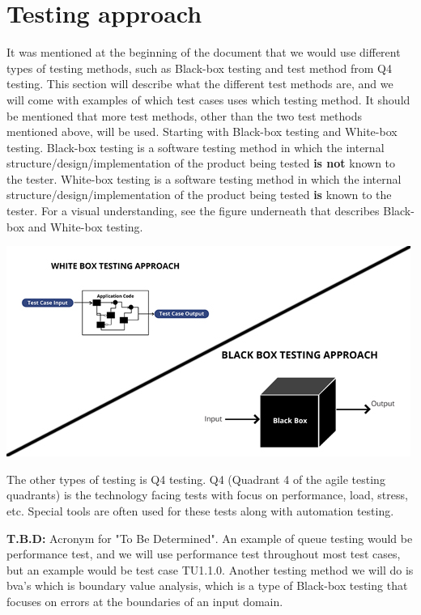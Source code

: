 \documentclass{article}
\begin{document}
\section*{Testing approach}
It was mentioned at the beginning of the document that we would use different types of testing methods, such as Black-box testing and test method from Q4 testing. This section will describe what the different test methods are, and we will come with examples of which test cases uses which testing method. It should be mentioned that more test methods, other than the two test methods mentioned above, will be used.
\newline
Starting with Black-box testing and White-box testing. Black-box testing is a software testing method in which the internal structure/design/implementation of the product being tested \textbf{is not} known to the tester. White-box testing is a software testing method in which the internal structure/design/implementation of the product being tested \textbf{is} known to the tester. For a visual understanding, see the figure underneath that describes Black-box and White-box testing.
\begin{center}
\includegraphics[width = \linewidth]{BlackboxvsWhitebox.jpg} 
\end{center}
The other types of testing is Q4 testing. Q4 (Quadrant 4 of the agile testing quadrants) is the technology facing tests with focus on performance, load, stress, etc. Special tools are often used for these tests along with automation testing.
\item \textbf{T.B.D:} Acronym for "To Be Determined". An example of queue testing would be performance test, and we will use performance test throughout most test cases, but an example would be test case TU1.1.0. Another testing method we will do is bva's which is boundary value analysis, which is a type of Black-box testing that focuses on errors at the boundaries of an input domain.
\end{document}
